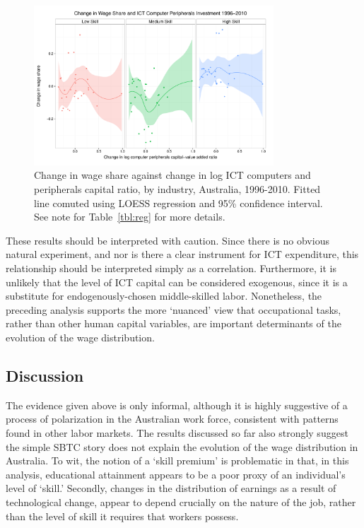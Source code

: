 \begin{figure}
  \centering
  \includegraphics[width=0.8\textwidth]{../figure/wage_share_peripherals_skill.pdf}
  \caption{Change in wage share against change in log ICT computers and peripherals capital ratio, by industry, Australia, 1996-2010. Fitted line comuted using LOESS regression and 95\% confidence interval.
    See note for Table~\ref{tbl:reg} for more details.
  }
  \label{fig:periph}
\end{figure}



These results should be interpreted with caution. Since there is no obvious natural experiment, and nor is there a clear instrument for ICT expenditure, this relationship should be interpreted simply as a correlation. Furthermore, it is unlikely that the level of ICT capital can be considered exogenous, since it is a substitute for endogenously-chosen middle-skilled labor. Nonetheless, the preceding analysis supports the more `nuanced' view that occupational tasks, rather than other human capital variables, are important determinants of the evolution of the wage distribution.

\subsection{Discussion}

The evidence given above is only informal, although it is highly suggestive of a process of polarization in the Australian work force, consistent with patterns found in other labor markets. The results discussed so far also strongly suggest the simple SBTC story does not explain the evolution of the wage distribution in Australia. To wit, the notion of a `skill premium' is problematic in that, in this analysis, educational attainment appears to be a poor proxy of an individual's level of `skill.' Secondly, changes in the distribution of earnings as a result of technological change, appear to depend crucially on the nature of the job, rather than the level of skill it requires that workers possess.

